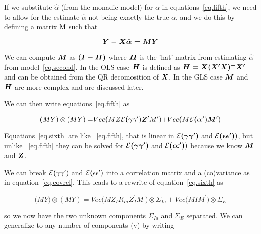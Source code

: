 \documentclass[titlepage]{article}  %
\begin{document}
If we substitute $\hat{\alpha}$ (from the monadic model) for $\alpha$ in equations~\ref{eq.fifth}, we need to allow for the estimate $\hat{\alpha}$ not being exactly the true $\alpha$, and we do this by defining a matrix $\mbox{\boldmath M}$ such that 

\begin{displaymath}
\mbox{\boldmath $Y - X \hat{\alpha} = M Y$}
\end{displaymath}

We can compute $\mbox{\boldmath $M$}$ as $\mbox{\boldmath $(I - H)$}$ where $\mbox{\boldmath $H$}$ is the 'hat' matrix from estimating $\hat{\alpha}$ from model~\ref{eq.second}. In the OLS case $\mbox{\boldmath $H$}$ is defined as $\mbox{\boldmath $H = X(X^{\prime}X)^{-}X^{\prime}$}$ and can be obtained from the QR decomosition of $\mbox{\boldmath $X$}$. In the GLS case $\mbox{\boldmath $M$}$ and $\mbox{\boldmath $H$}$ are more complex and are discussed later.

We can then write equations~\ref{eq.fifth} as

\begin{equation}
{\bm (MY)\otimes(MY) = } Vec{\bm (MZ}{\cal E}{\bm (\gamma \gamma^{\prime}){\bm Z^{\prime}M^{\prime})}  + } Vec{\bm (M}{\cal E}{\bm (\epsilon \epsilon^{\prime})}{\bm M^{\prime})}     \label{eq.sixth}
\end{equation}
 
Equations~\ref{eq.sixth} are like ~\ref{eq.fifth}, that is linear in ${\cal E}\mbox{\boldmath $(\gamma \gamma^{\prime})$}$ and ${\cal E}\mbox{\boldmath $(\epsilon \epsilon^{\prime})$})$, but unlike ~\ref{eq.fifth} they can be solved for ${\cal E}\mbox{\boldmath $(\gamma \gamma^{\prime})$}$ and ${\cal E}\mbox{\boldmath $(\epsilon \epsilon^{\prime})$})$ because we know $\mbox{\boldmath $M$}$ and $\mbox{\boldmath $Z$}$. 

We can break ${\cal E}{\bm (\gamma \gamma^{\prime})}$ and ${\cal E}{\bm (\epsilon \epsilon^{\prime})}$ into a correlation matrix and a (co)variance as in equation~\ref{eq.covrel}. This leads to a rewrite of equation~\ref{eq.sixth} as

\begin{equation}
{\bm (MY)\otimes(MY) = } Vec{\bm (MZ_{I} R_{Ia} Z_{I}^{\prime}M^{\prime}) \otimes \Sigma_{Ia}  + } Vec{\bm (M I M^{\prime}) \otimes \Sigma_{E}}     \label{eq.sixa}
\end{equation}

so we now have the two unknown components $\Sigma_{Ia}$ and $\Sigma_{E}$ separated. We can generalize to any number of components (v) by writing
\end{document}
